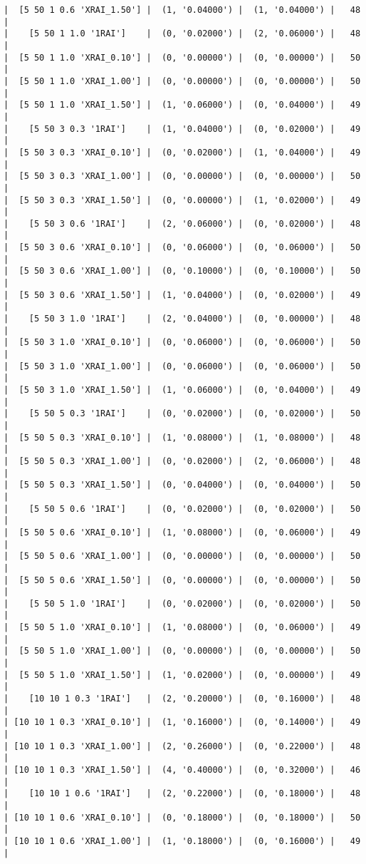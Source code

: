 \documentclass{article}
\begin{document}
\begin{verbatim}
|  [5 50 1 0.6 'XRAI_1.50'] |  (1, '0.04000') |  (1, '0.04000') |   48  |
|    [5 50 1 1.0 '1RAI']    |  (0, '0.02000') |  (2, '0.06000') |   48  |
|  [5 50 1 1.0 'XRAI_0.10'] |  (0, '0.00000') |  (0, '0.00000') |   50  |
|  [5 50 1 1.0 'XRAI_1.00'] |  (0, '0.00000') |  (0, '0.00000') |   50  |
|  [5 50 1 1.0 'XRAI_1.50'] |  (1, '0.06000') |  (0, '0.04000') |   49  |
|    [5 50 3 0.3 '1RAI']    |  (1, '0.04000') |  (0, '0.02000') |   49  |
|  [5 50 3 0.3 'XRAI_0.10'] |  (0, '0.02000') |  (1, '0.04000') |   49  |
|  [5 50 3 0.3 'XRAI_1.00'] |  (0, '0.00000') |  (0, '0.00000') |   50  |
|  [5 50 3 0.3 'XRAI_1.50'] |  (0, '0.00000') |  (1, '0.02000') |   49  |
|    [5 50 3 0.6 '1RAI']    |  (2, '0.06000') |  (0, '0.02000') |   48  |
|  [5 50 3 0.6 'XRAI_0.10'] |  (0, '0.06000') |  (0, '0.06000') |   50  |
|  [5 50 3 0.6 'XRAI_1.00'] |  (0, '0.10000') |  (0, '0.10000') |   50  |
|  [5 50 3 0.6 'XRAI_1.50'] |  (1, '0.04000') |  (0, '0.02000') |   49  |
|    [5 50 3 1.0 '1RAI']    |  (2, '0.04000') |  (0, '0.00000') |   48  |
|  [5 50 3 1.0 'XRAI_0.10'] |  (0, '0.06000') |  (0, '0.06000') |   50  |
|  [5 50 3 1.0 'XRAI_1.00'] |  (0, '0.06000') |  (0, '0.06000') |   50  |
|  [5 50 3 1.0 'XRAI_1.50'] |  (1, '0.06000') |  (0, '0.04000') |   49  |
|    [5 50 5 0.3 '1RAI']    |  (0, '0.02000') |  (0, '0.02000') |   50  |
|  [5 50 5 0.3 'XRAI_0.10'] |  (1, '0.08000') |  (1, '0.08000') |   48  |
|  [5 50 5 0.3 'XRAI_1.00'] |  (0, '0.02000') |  (2, '0.06000') |   48  |
|  [5 50 5 0.3 'XRAI_1.50'] |  (0, '0.04000') |  (0, '0.04000') |   50  |
|    [5 50 5 0.6 '1RAI']    |  (0, '0.02000') |  (0, '0.02000') |   50  |
|  [5 50 5 0.6 'XRAI_0.10'] |  (1, '0.08000') |  (0, '0.06000') |   49  |
|  [5 50 5 0.6 'XRAI_1.00'] |  (0, '0.00000') |  (0, '0.00000') |   50  |
|  [5 50 5 0.6 'XRAI_1.50'] |  (0, '0.00000') |  (0, '0.00000') |   50  |
|    [5 50 5 1.0 '1RAI']    |  (0, '0.02000') |  (0, '0.02000') |   50  |
|  [5 50 5 1.0 'XRAI_0.10'] |  (1, '0.08000') |  (0, '0.06000') |   49  |
|  [5 50 5 1.0 'XRAI_1.00'] |  (0, '0.00000') |  (0, '0.00000') |   50  |
|  [5 50 5 1.0 'XRAI_1.50'] |  (1, '0.02000') |  (0, '0.00000') |   49  |
|    [10 10 1 0.3 '1RAI']   |  (2, '0.20000') |  (0, '0.16000') |   48  |
| [10 10 1 0.3 'XRAI_0.10'] |  (1, '0.16000') |  (0, '0.14000') |   49  |
| [10 10 1 0.3 'XRAI_1.00'] |  (2, '0.26000') |  (0, '0.22000') |   48  |
| [10 10 1 0.3 'XRAI_1.50'] |  (4, '0.40000') |  (0, '0.32000') |   46  |
|    [10 10 1 0.6 '1RAI']   |  (2, '0.22000') |  (0, '0.18000') |   48  |
| [10 10 1 0.6 'XRAI_0.10'] |  (0, '0.18000') |  (0, '0.18000') |   50  |
| [10 10 1 0.6 'XRAI_1.00'] |  (1, '0.18000') |  (0, '0.16000') |   49  |

\end{verbatim}
\end{document}
